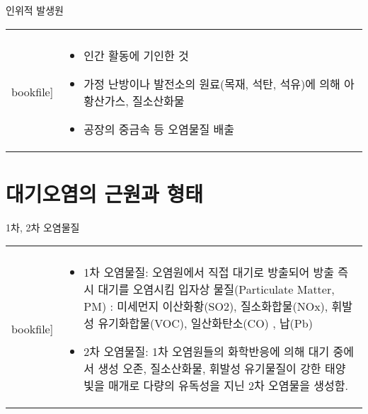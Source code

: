 \begin{frame}[t]{인위적 발생원}
	\begin{tabular}{ll}
		\begin{minipage}[t]{0.5\textwidth}\scriptsize
			\begin{figure}[t]
				\texttt{[image: \\bookfile]}
			\end{figure}
		\end{minipage}	
		&
		\begin{minipage}[t]{0.45\textwidth} \scriptsize	
			\begin{itemize}
				\item 인간 활동에 기인한 것
				\item 가정 난방이나 발전소의 원료(목재, 석탄, 석유)에 의해 아황산가스, 질소산화물
				\item 공장의 중금속 등 오염물질 배출
					
			\end{itemize}

		\end{minipage}
	\end{tabular}
\end{frame}





\section{대기오염의 근원과 형태}


\begin{frame}[t]{1차, 2차 오염물질}
	\begin{tabular}{ll}
		\begin{minipage}[t]{0.4\textwidth}\scriptsize
			\begin{figure}[t]
				\texttt{[image: \\bookfile]}
			\end{figure}
		\end{minipage}	
		&
		\begin{minipage}[t]{0.55\textwidth} \scriptsize	
			\begin{itemize}
				\item 1차 오염물질: 오염원에서 직접 대기로 방출되어 방출 즉시 대기를 오염시킴
				입자상 물질(Particulate Matter, PM) : 미세먼지
				이산화황(SO2), 질소화합물(NOx), 휘발성 유기화합물(VOC), 일산화탄소(CO) , 납(Pb)
				\item 2차 오염물질: 1차 오염원들의 화학반응에 의해 대기 중에서 생성
				오존, 질소산화물, 휘발성 유기물질이 강한 태양 빛을 매개로 다량의 유독성을 지닌 2차 오염물을 생성함. 
				
			\end{itemize}

		\end{minipage}
	\end{tabular}
\end{frame}



